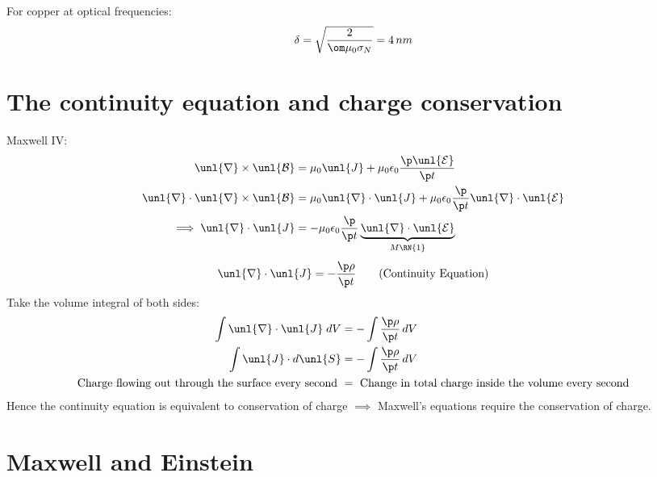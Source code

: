 \documentclass[a4paper, 11pt, normalem]{report}
\renewcommand\E{\mathcal{E}}
\newcommand\uE{\unl{\E}}
\renewcommand\B{\mathcal{B}}
\newcommand\uB{\unl{\B}}
\renewcommand\del{\unl{\nabla}}
\newcommand\eno{\epsilon_0}
\newcommand\J{\unl{J}}
\begin{document}
For copper at optical frequencies:
\begin{equation}
    \delta = \sqrt{\frac{2}{\om\mu_0\sigma_N}} = 4\,nm
\end{equation}

\section{The continuity equation and charge conservation}
Maxwell \RN{4}:
\begin{align}
    \del\times\uB &= \mu_0\J + \mu_0\eno\frac{\p\uE}{\p t} \\
    \del\cdot\del\times\uB &= \mu_0\del\cdot\J + \mu_0\eno\frac{\p}{\p t}\del\cdot\uE \\
    \implies \del\cdot\J &= -\mu_0\eno\frac{\p}{\p t}\underbrace{\del\cdot\uE}_{M\RN{1}}
\end{align}
\begin{equation}
    \del\cdot\J = -\frac{\p\rho}{\p t} \tag{Continuity Equation}
\end{equation}
Take the volume integral of both sides:
\begin{align}
    \int \del\cdot\J\;dV &= -\int \frac{\p\rho}{\p t}\,dV \\
    \int \J \cdot d\unl{S} &= -\int \frac{\p\rho}{\p t}\,dV \\
    \text{Charge flowing out through the surface every second } &= \text{ Change in total charge inside the volume every second}
\end{align}
Hence the continuity equation is equivalent to conservation of charge $\implies$ Maxwell's equations require the conservation of charge.

\section{Maxwell and Einstein}
\end{document}
